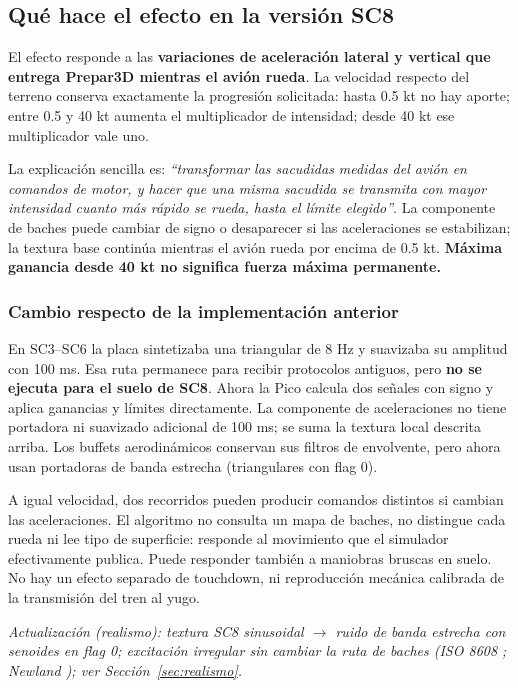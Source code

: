 \subsection{Qué hace el efecto en la versión SC8}
El efecto responde a las \textbf{variaciones de aceleración lateral y vertical que entrega Prepar3D mientras el avión rueda}. La velocidad respecto del terreno conserva exactamente la progresión solicitada: hasta 0.5 kt no hay aporte; entre 0.5 y 40 kt aumenta el multiplicador de intensidad; desde 40 kt ese multiplicador vale uno.

La explicación sencilla es: \emph{``transformar las sacudidas medidas del avión en comandos de motor, y hacer que una misma sacudida se transmita con mayor intensidad cuanto más rápido se rueda, hasta el límite elegido''}. La componente de baches puede cambiar de signo o desaparecer si las aceleraciones se estabilizan; la textura base continúa mientras el avión rueda por encima de 0.5 kt. \textbf{Máxima ganancia desde 40 kt no significa fuerza máxima permanente.}

\subsubsection{Cambio respecto de la implementación anterior}
En SC3--SC6 la placa sintetizaba una triangular de 8 Hz y suavizaba su amplitud con 100 ms. Esa ruta permanece para recibir protocolos antiguos, pero \textbf{no se ejecuta para el suelo de SC8}. Ahora la Pico calcula dos señales con signo y aplica ganancias y límites directamente. La componente de aceleraciones no tiene portadora ni suavizado adicional de 100 ms; se suma la textura local descrita arriba. Los buffets aerodinámicos conservan sus filtros de envolvente, pero ahora usan portadoras de banda estrecha (triangulares con flag 0).

A igual velocidad, dos recorridos pueden producir comandos distintos si cambian las aceleraciones. El algoritmo no consulta un mapa de baches, no distingue cada rueda ni lee tipo de superficie: responde al movimiento que el simulador efectivamente publica. Puede responder también a maniobras bruscas en suelo. No hay un efecto separado de touchdown, ni reproducción mecánica calibrada de la transmisión del tren al yugo.

\textit{Actualización (realismo): textura SC8 sinusoidal $\rightarrow$ ruido de banda estrecha con senoides en flag 0; excitación irregular sin cambiar la ruta de baches (ISO 8608 \cite{iso8608}; Newland \cite{newland1993}); ver Sección~\ref{sec:realismo}.}

